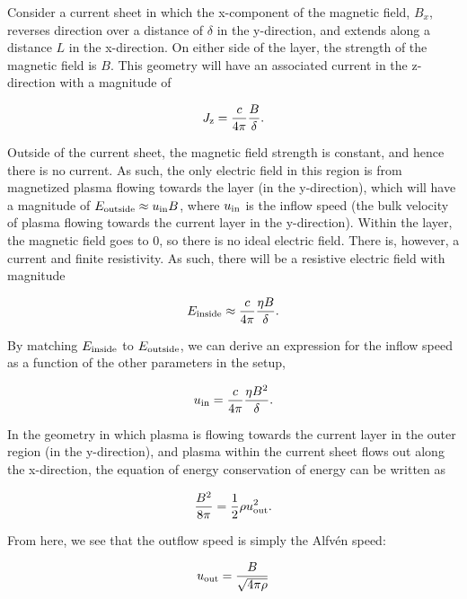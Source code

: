 Consider a current sheet in which the x-component of the magnetic field, $B_x$, reverses direction over a distance of $\delta$ in the y-direction, and extends along a distance $L$ in the x-direction.  On either side of the layer, the strength of the magnetic field is $B$.  This geometry will have an associated current in the z-direction with a magnitude of 

\begin{equation}
	J_{\rm{z}} = \frac{c}{4 \pi}\frac{B}{\delta}.
\end{equation}    

Outside of the current sheet, the magnetic field strength is constant, and hence there is no current.  As such, the only electric field in this region is from magnetized plasma flowing towards the layer (in the y-direction), which will have a magnitude of $E_{\rm{outside}} \approx u_{\rm{in}}B$, where $u_{\rm{in}}$ is the inflow speed (the bulk velocity of plasma flowing towards the current layer in the y-direction).  Within the layer, the magnetic field goes to 0, so there is no ideal electric field.  There is, however, a current and finite resistivity.  As such, there will be a resistive electric field with magnitude 

\begin{equation}
E_{\rm{inside}} \approx \frac{c}{4\pi}\frac{\eta B}{\delta}.
\end{equation}

By matching $E_{\rm{inside}}$ to $E_{\rm{outside}}$, we can derive an expression for the inflow speed as a function of the other parameters in the setup,

\begin{equation}
	u_{\rm{in}} = \frac{c}{4 \pi} \frac{\eta B^2}{\delta}.
\end{equation}

In the geometry in which plasma is flowing towards the current layer in the outer region (in the y-direction), and plasma within the current sheet flows out along the x-direction, the equation of energy conservation of energy can be written as

\begin{equation}
	\frac{B^2}{8 \pi} = \frac{1}{2}\rho u_{\rm{out}}^2.
\end{equation}

From here, we see that the outflow speed is simply the Alfv\'en speed: 

\begin{equation}
	u_{\rm{out}}=\frac{B}{\sqrt{4\pi \rho}}
\end{equation}

